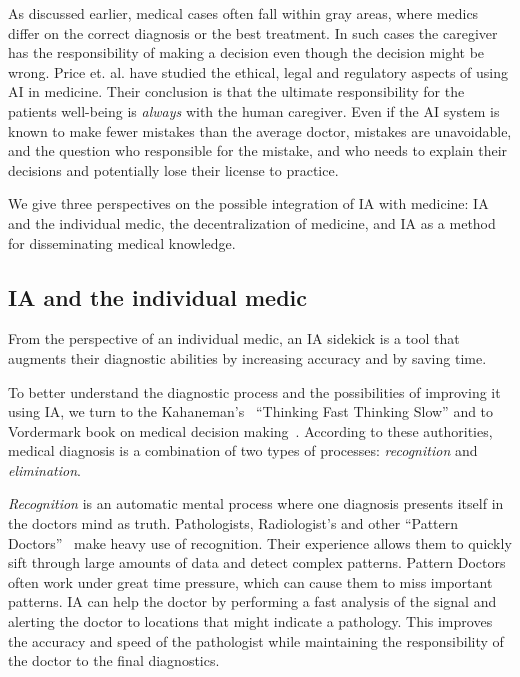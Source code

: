 \documentclass[11pt]{pnas-new}
\begin{document}
As discussed earlier, medical cases often fall within gray areas, where
medics differ on the correct diagnosis or the best treatment. In such
cases the caregiver has the responsibility of making a decision even
though the decision might be wrong. Price et. al. have studied the ethical,
legal and regulatory aspects of using AI in
medicine.\cite{price2014black,ford2016privacy, price2017regulating}
Their conclusion is that the ultimate responsibility for the patients
well-being is {\em always} with the human caregiver. Even if the AI
system is known to make fewer mistakes than the average doctor,
mistakes are unavoidable, and the question who responsible for
the mistake, and who needs to explain their decisions and potentially lose their license to practice.


\iffalse

In this book the point is made that human error is inevitable.
\yoav{ What is the main point of this paper? \cite{donaldson2000err}}

\sout{
Today, and in the foreseeable
future, \sout {\color{blue}non-trivial efforts are needed to convert} medicine \sout{will not be}{\color{blue}to} a precise science. {\color{blue}Even if medicine fulfills precise science,} incorrect decisions {\color{blue}is inevitable due to human natures \cite{donaldson2000err}, and }
can result in harm or death.  }
\fi

We give three perspectives on the possible integration of IA with
medicine: IA and the individual medic, the decentralization of
medicine, and IA as a method for disseminating medical knowledge.

\subsection{IA and the individual medic}

 
From the perspective of an individual medic, an IA sidekick is a
tool that augments their diagnostic abilities by increasing accuracy
and by saving time.

To better understand the diagnostic process and the possibilities  of
improving it using IA, we turn to the Kahaneman's~\cite{kahneman2011thinking}
``Thinking Fast Thinking Slow'' and to Vordermark book on medical
decision making~\cite{vordermark2019introduction}. According to these authorities,
medical diagnosis is a combination of two types of processes: {\em
  recognition} and {\em elimination}.

{\em Recognition} is an automatic mental process where one diagnosis
presents itself in the doctors mind as truth. Pathologists,
Radiologist's and other ``Pattern Doctors''~\cite{topol2019deep} make heavy use
of recognition. Their experience allows them to quickly sift through
large amounts of data and detect complex patterns. Pattern Doctors
often work under great time pressure, which can cause them to miss
important patterns. IA can help the doctor by performing a fast
analysis of the signal and alerting the doctor to locations that might
indicate a pathology. This improves the accuracy and speed of the
pathologist while maintaining the responsibility of the doctor to the
final diagnostics. 
\end{document}
